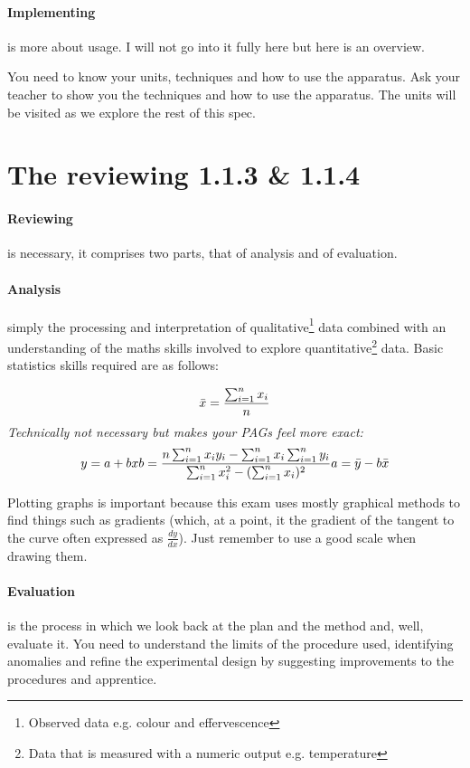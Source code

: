 	\paragraph{Implementing} is more about usage. I will not go into it fully here but here is an overview.
	
	You need to know your units, techniques and how to use the apparatus. Ask your teacher to show you the techniques and how to use the apparatus. The units will be visited as we explore the rest of this spec.
	
\section{The reviewing 1.1.3 \& 1.1.4}
	
	\paragraph{Reviewing} is necessary, it comprises two parts, that of analysis and of evaluation.
	
	\paragraph{Analysis} simply the processing and interpretation of qualitative\footnote{Observed data e.g. colour and effervescence} data combined with an understanding of the maths skills involved to explore quantitative\footnote{Data that is measured with a numeric output e.g. temperature} data. Basic statistics skills required are as follows:
	
	\begin{center}
		\begin{equation}
		\bar{x} = \frac{\sum_{i=1}^n x_i}{n}
		\end{equation}
		\textit{Technically not necessary but makes your PAGs feel more exact:}
		\begin{equation}
		y=a + bx \newline
		b=\frac{n\sum_{i=1}^n x_iy_i - \sum_{i=1}^n x_i \sum_{i=1}^n y_i}{\sum_{i=1}^n x^2_i -(\sum_{i=1}^n x_i)^2} \newline
		a = \mean{y} - b\mean{x}
		\end{equation}
	\end{center}
	
	Plotting graphs is important because this exam uses mostly graphical methods to find things such as gradients (which, at a point, it the gradient of the tangent to the curve often expressed as $\frac{dy}{dx}$). Just remember to use a good scale when drawing them.
	
	\paragraph{Evaluation} is the process in which we look back at the plan and the method and, well, evaluate it. You need to understand the limits of the procedure used, identifying anomalies and refine the experimental design by suggesting improvements to the procedures and apprentice.